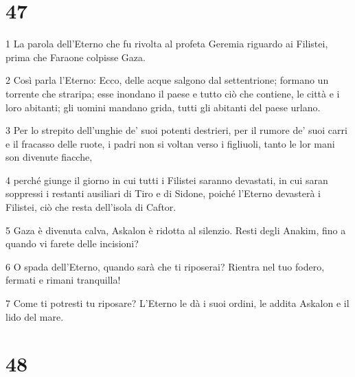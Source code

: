 \chapter{47}

\par 1 La parola dell'Eterno che fu rivolta al profeta Geremia riguardo ai Filistei, prima che Faraone colpisse Gaza.
\par 2 Così parla l'Eterno: Ecco, delle acque salgono dal settentrione; formano un torrente che straripa; esse inondano il paese e tutto ciò che contiene, le città e i loro abitanti; gli uomini mandano grida, tutti gli abitanti del paese urlano.
\par 3 Per lo strepito dell'unghie de' suoi potenti destrieri, per il rumore de' suoi carri e il fracasso delle ruote, i padri non si voltan verso i figliuoli, tanto le lor mani son divenute fiacche,
\par 4 perché giunge il giorno in cui tutti i Filistei saranno devastati, in cui saran soppressi i restanti ausiliari di Tiro e di Sidone, poiché l'Eterno devasterà i Filistei, ciò che resta dell'isola di Caftor.
\par 5 Gaza è divenuta calva, Askalon è ridotta al silenzio. Resti degli Anakim, fino a quando vi farete delle incisioni?
\par 6 O spada dell'Eterno, quando sarà che ti riposerai? Rientra nel tuo fodero, fermati e rimani tranquilla!
\par 7 Come ti potresti tu riposare? L'Eterno le dà i suoi ordini, le addita Askalon e il lido del mare.

\chapter{48}

